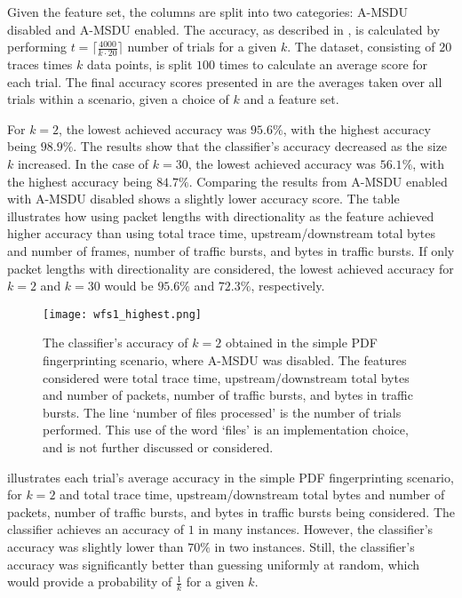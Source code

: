 Given the feature set, the columns are split into two categories: A-MSDU disabled and A-MSDU enabled. The accuracy, as described in , is calculated by performing $t = \lceil \tfrac{4000}{k \cdot 20} \rceil$ number of trials for a given $k$. The dataset, consisting of $20$ traces times $k$ data points, is split $100$ times to calculate an average score for each trial. The final accuracy scores presented in  are the averages taken over all trials within a scenario, given a choice of $k$ and a feature set. 

For $k=2$, the lowest achieved accuracy was $95.6\%$, with the highest accuracy being $98.9\%$. The results show that the classifier's accuracy decreased as the size $k$ increased. In the case of $k=30$, the lowest achieved accuracy was $56.1\%$, with the highest accuracy being $84.7\%$. Comparing the results from A-MSDU enabled with A-MSDU disabled shows a slightly lower accuracy score. The table illustrates how using packet lengths with directionality as the feature achieved higher accuracy than using total trace time, upstream/downstream total bytes and number of frames, number of traffic bursts, and bytes in traffic bursts. If only packet lengths with directionality are considered, the lowest achieved accuracy for $k=2$ and $k=30$ would be $95.6\%$ and $72.3\%$, respectively.

\begin{figure}[t]
	\centering
        \texttt{[image: wfs1\_highest.png]}
        \caption{The classifier's accuracy of $k=2$ obtained in the simple PDF fingerprinting scenario, where A-MSDU was disabled. The features considered were total trace time, upstream/downstream total bytes and number of packets, number of traffic bursts, and bytes in traffic bursts. The line `number of files processed' is the number of trials performed. This use of the word `files' is an implementation choice, and is not further discussed or considered.}
    \label{fig:wfs1_highest}
\end{figure}

 illustrates each trial's average accuracy in the simple PDF fingerprinting scenario, for $k=2$ and total trace time, upstream/downstream total bytes and number of packets, number of traffic bursts, and bytes in traffic bursts being considered. The classifier achieves an accuracy of $1$ in many instances. However, the classifier's accuracy was slightly lower than $70\%$ in two instances. Still, the classifier's accuracy was significantly better than guessing uniformly at random, which would provide a probability of $\tfrac{1}{k}$ for a given $k$.

